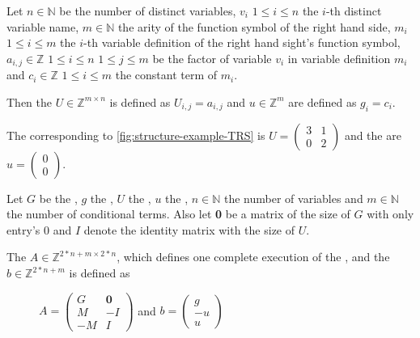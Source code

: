 \begin{definition}
	\label{def:update}
	Let $n \in \mathbb{N}$ be the number of distinct variables, $v_i$ $1 \le i \le n$ the $i$-th distinct		variable name, $m \in \mathbb{N}$ the arity of the function symbol of the right hand side, $m_i$ $1 \le i \le m$ the $i$-th variable definition of the right hand sight's function symbol, $a_{i,j} \in \mathbb{Z}$ $1 \le i \le n$ $1 \le j \le m$ be the factor of variable $v_i$ in variable definition $m_i$ and $c_i \in \mathbb{Z}$ $1 \le i \le m$ the constant term of $m_i$. \newline
	
	Then the \updatematrix $U \in \mathbb{Z}^{m \times n}$ is defined as $U_{i,j}=a_{i,j}$ and \updateconstants $u \in \mathbb{Z}^m$ are defined as $g_i = c_i$.
\end{definition}
\begin{example}
	The corresponding \updatematrix to \autoref{fig:structure-example-TRS} is $U = \begin{pmatrix} 3 & 1 \\ 0 & 2 \end{pmatrix}$ and the \updateconstants are $u = \begin{pmatrix} 0 \\ 0 \end{pmatrix}$.
\end{example}

\begin{definition}
	\label{def:iteration}
	Let $G$ be the \guardmatrix, $g$ the \guardconstants, $U$ the \updatematrix, $u$ the \updateconstants, $n\in \mathbb{N}$ the number of variables and $m \in \mathbb{N}$ the number of conditional terms. \newline
	Also let \textbf{0} be a matrix of the size of $G$ with only entry's 0 and $I$ denote the identity matrix with the size of $U$. \newline
	
	The \iterationmatrix $A \in \mathbb{Z}^{2*n+m \times 2*n}$, which defines one complete execution of the \loopt, and the \iterationconstants $b\in \mathbb{Z}^{2*n+m} $ is defined as
	\begin{figure}[H]
		\centering
		$A = \begin{pmatrix} G & \textbf{0} \\ M & -I \\ -M & I \end{pmatrix}$ and $b = \begin{pmatrix} g \\ -u \\ u \end{pmatrix}$ \cite{leike2014geometric}
	\end{figure}	
\end{definition}

